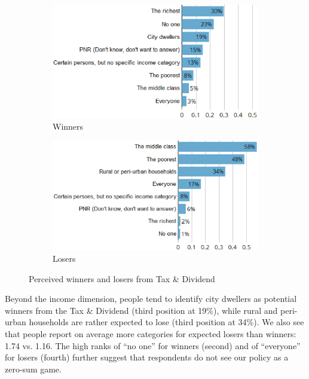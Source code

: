 \documentclass[english,5p,authoryear]{elsarticle}
\begin{document}
\begin{figure}[t]
\centering
\begin{subfigure}[b]{\columnwidth}
   \caption{Winners}
   \includegraphics[width=\columnwidth]{Images_EPS/tax_winners_synchro.eps}
\end{subfigure}

\begin{subfigure}[b]{\columnwidth}
\vspace{0.3cm}
   \caption{Losers}
   \includegraphics[width=\columnwidth]{Images_EPS/tax_losers_synchro.eps}
\end{subfigure}
\caption{Perceived winners and losers from Tax \& Dividend}
\label{fig:winners_losers}
\end{figure}

Beyond the income dimension, people tend to identify city dwellers as potential winners from the Tax \& Dividend (third position at 19\%), while rural and peri-urban households are rather expected to lose (third position at 34\%). We also see that people report on average more categories for expected losers than winners: 1.74 vs. 1.16. The high ranks of ``no one'' for winners (second) and of ``everyone'' for losers (fourth) further suggest that respondents do not see our policy as a zero-sum game. %
%
\end{document}
